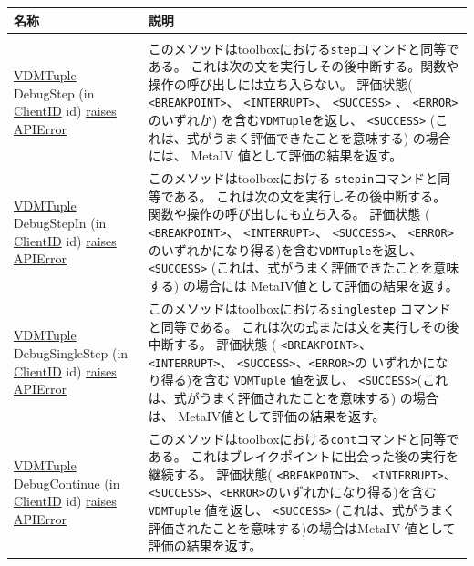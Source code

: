 \documentclass[\pformat,12pt]{jarticle}
\newcommand{\pbs}[1]{\let\temp=\\#1\let\\=\temp}
\newenvironment{interfacetable}{%
  \begin{longtable}{|>{\pbs\raggedright\ttfamily}p{6.6cm}%
                    |>{\pbs\raggedright}p{6.6cm}|} \hline
  \textrm{\bfseries 名称} &  \textbf{説明} \\ \hline
  \endhead
  }{\end{longtable}}
\newcommand{\APIError}{\hyperlink{exception.APIError}{raises APIError}}
\newcommand{\ClientID}{\hyperlink{type.ClientID}{ClientID}}
\newcommand{\VDMTuple}{\hyperlink{interface.VDMTuple}{VDMTuple}}
\begin{document}
\begin{interfacetable}
\\ \hline
{\VDMTuple} DebugStep (in {\ClientID} id) \APIError 
  & このメソッドはtoolboxにおける{\tt step}コマンドと同等である。
  これは次の文を実行しその後中断する。関数や操作の呼び出しには立ち入らない。
  評価状態(
  {\tt <BREAKPOINT>}、 {\tt <INTERRUPT>}、 {\tt <SUCCESS>} 、 {\tt <ERROR>}のいずれか)
  を含む{\tt VDMTuple}を返し、
  {\tt <SUCCESS>} (これは、式がうまく評価できたことを意味する) の場合には、
   MetaIV 値として評価の結果を返す。
\\ \hline
{\VDMTuple} DebugStepIn (in {\ClientID} id) \APIError 
  & このメソッドはtoolboxにおける {\tt stepin}コマンドと同等である。
  これは次の文を実行しその後中断する。
  関数や操作の呼び出しにも立ち入る。
  評価状態 (
   {\tt <BREAKPOINT>}、 {\tt <INTERRUPT>}、 {\tt <SUCCESS>}、 {\tt <ERROR>}のいずれかになり得る)を含む{\tt VDMTuple}を返し、
{\tt <SUCCESS>}
  (これは、式がうまく評価できたことを意味する) の場合には
  MetaIV値として評価の結果を返す。
\\ \hline
{\VDMTuple} DebugSingleStep (in {\ClientID} id) \APIError 
  & このメソッドはtoolboxにおける{\tt singlestep} コマンドと同等である。
  これは次の式または文を実行しその後中断する。
  評価状態 (
   {\tt <BREAKPOINT>}、 {\tt <INTERRUPT>}、 {\tt <SUCCESS>}、{\tt <ERROR>}の
  いずれかになり得る)を含む {\tt VDMTuple} 値を返し、
  {\tt <SUCCESS>}(これは、式がうまく評価されたことを意味する) の場合は、
  MetaIV値として評価の結果を返す。
\\ \hline
{\VDMTuple} DebugContinue (in {\ClientID} id) \APIError 
  & このメソッドはtoolboxにおける{\tt cont}コマンドと同等である。
  これはブレイクポイントに出会った後の実行を継続する。
  評価状態(
  {\tt <BREAKPOINT>}、 {\tt <INTERRUPT>}、 {\tt <SUCCESS>}、{\tt <ERROR>}のいずれかになり得る)を含む {\tt VDMTuple} 値を返し、
  {\tt <SUCCESS>} (これは、式がうまく評価されたことを意味する)の場合はMetaIV 値として評価の結果を返す。
 
\\ \hline

\end{interfacetable}
\end{document}
